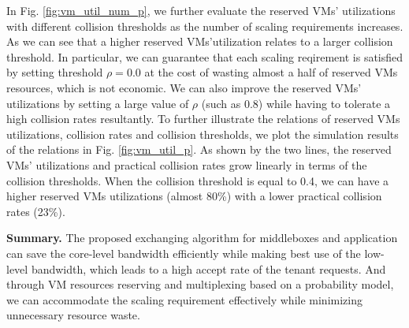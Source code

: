 \documentclass[review]{elsarticle}
\begin{document}
In Fig. \ref{fig:vm_util_num_p}, we further evaluate the reserved VMs' utilizations with different collision thresholds as the number of scaling requirements increases. As we can see that a higher reserved VMs'utilization relates to a larger collision threshold. In particular, we can guarantee that each scaling reqirement is satisfied by setting threshold $\rho=0.0$ at the cost of wasting almost a half of reserved VMs resources, which is not economic. We can also improve the reserved VMs' utilizations by setting a large value of $\rho$ (such as 0.8) while having to tolerate a high collision rates resultantly. To further illustrate the relations of reserved VMs utilizations, collision rates and collision thresholds, we plot the simulation results of the relations in Fig. \ref{fig:vm_util_p}.
As shown by the two lines, the reserved VMs' utilizations and practical collision rates grow linearly in terms of the collision thresholds. When the collision threshold is equal to 0.4, we can have a higher reserved VMs utilizations (almost 80\%) with a lower practical collision rates (23\%). 

\textbf{Summary.}
The proposed exchanging algorithm for middleboxes and application can save the core-level bandwidth efficiently while making best use of the low-level bandwidth, which leads to a high accept rate of the tenant requests. And through VM resources reserving and multiplexing based on a probability model, we can accommodate the scaling requirement effectively while minimizing unnecessary resource waste.  
\end{document}
